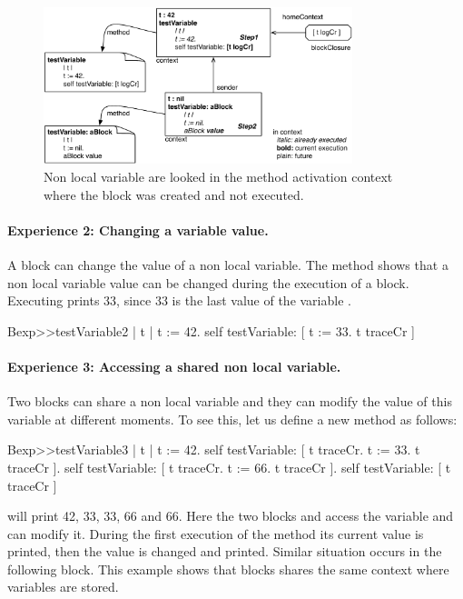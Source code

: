 \documentclass[a4paper,10pt,twoside]{book}
\begin{document}
\begin{figure}[!h]
\begin{center}\includegraphics[width=9cm]{variable}
\caption{ Non local variable are looked in the method activation context where the block was created and not executed.\label{fig:variable}}
\end{center}
\end{figure}


\paragraph{Experience 2: Changing a variable value.} A block can change the value of a non local variable.
The method  shows that a non local variable value can be changed during the execution of a block. Executing  prints 33, since 33 is the last value of the variable .


\begin{code}{}
Bexp>>testVariable2
	| t |
	t := 42.
	self testVariable: [ t := 33. t traceCr ]
\end{code}
\paragraph{Experience 3: Accessing a shared non local variable.}
Two blocks can share a non local variable and they can modify the value of this variable at different moments. To see this, let us define a new method  as follows:

\begin{code}{}
Bexp>>testVariable3
	| t |
	t := 42.
	self testVariable: [ t traceCr. t := 33. t traceCr ].
	self testVariable: [ t traceCr. t := 66. t traceCr ].
	self testVariable: [ t traceCr ]
\end{code}

 will print 42, 33, 33, 66 and 66.
Here the two blocks \ct{[ t := 33. t traceCr ]} and \ct{[ t := 66. t traceCr ]} access the variable  and can modify it. During the first execution of the method  its current value  is printed, then the value is changed and printed. Similar situation occurs in the following block. This example shows that blocks shares the same context where variables are stored.
\end{document}

